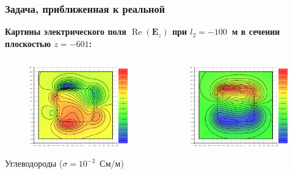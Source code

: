 \documentclass[aspectratio=43]{beamer}
\renewcommand{\Re}{\mathop{\mathrm{Re}}\nolimits}
\newcommand{\MakeTitle}[1]{\frametitle{\hspace{1.5em}\textbf{#1} \hfill \insertframenumber{} }}
\begin{document}
\begin{frame}
	\MakeTitle{Задача, приближенная к реальной}
	\textbf{Картины электрического поля $\Re(\mathbf{E}_z)$ при $l_2 = -100$~м в сечении плоскостью $z=-601$:}
	\begin{columns}[t,totalwidth=\linewidth]
		\hspace{-0.07\linewidth}
		\begin{column}{.5\linewidth}
			\vspace{-2.75em}
			\begin{figure}[H]
				\includegraphics[width=1.1\textwidth,height=1.1\textheight,keepaspectratio]{100_no_z=-601_EzR.eps}
			\end{figure}
			\begin{center}
				\vspace{-1em}
				\tiny{Углеводороды ($\sigma = 10^{-2}$~См/м)}
			\end{center}
		\end{column}
		\begin{column}{.5\linewidth}
			\vspace{-2.75em}
			\begin{figure}[H]
				\includegraphics[width=1.1\textwidth,height=1.1\textheight,keepaspectratio]{100_yes_z=-601_EzR.eps}

\end{figure}
\end{column}
\end{columns}
\end{frame}
\end{document}
